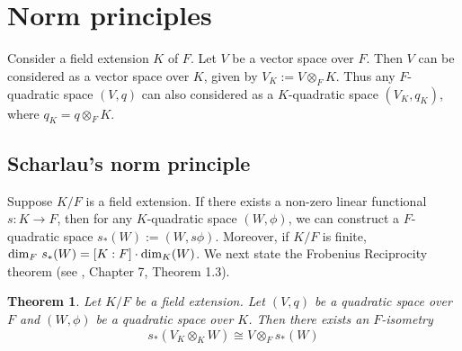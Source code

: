\documentclass[sn-mathphys-num]{sn-jnl}%
\newtheorem{theorem}{Theorem}[section]
\newtheorem{corollary}[theorem]{Corollary}
\begin{document}

\medskip


\section{Norm principles} %
Consider a field extension $K$ of $F$. Let $V$ be a vector space over $F$. Then $V$ can be considered as a vector space over $K$, given by $V_K:=V \otimes_F K$. Thus any $F$-quadratic space $(V,q)$ can also considered as a $K$-quadratic space $(V_K, q_K)$, where $q_K=q \otimes_F K$.
\subsection{Scharlau's norm principle}
Suppose $K/F$ is a field extension. If there exists a non-zero linear functional $s:K \to F$, then for any $K$-quadratic space $(W, \phi)$, we can construct a $F$-quadratic space $s_*(W):=(W, s\phi)$. Moreover, if $K/F$ is finite, ${\rm dim}_F\ s_*(W)=[K:F] \cdot {\rm dim}_K(W)$. 
We next state the Frobenius Reciprocity theorem (see \cite{lam}, Chapter 7, Theorem 1.3).
\medskip 

\begin{theorem}\label{Frobenius reciprocity}
Let $K/F$ be a field extension. Let $(V,q)$ be a quadratic space over $F$ and $(W, \phi)$ be a quadratic space over $K$. Then there exists an $F$-isometry
 \[s_*(V_K \otimes _K W) \cong V \otimes _F s_*(W)\]
\end{theorem}
\medskip 
\end{document}

